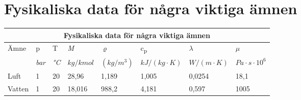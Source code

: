 \chapter{Fysikaliska data för några viktiga ämnen}
\footnotesize
\begin{tabularx}{\textwidth}{ |l|X|X|X|X|X|X|X|   }
\hline
\multicolumn{8}{|c|}{\textbf{Fysikaliska data för några viktiga ämnen}} \\
\hline
Ämne &p &T &\textit{M}&$\varrho$ &c\textsubscript{p}& $\lambda$ & $\mu$\\
		 &\textit{bar}&\textit{°C} &$kg/kmol$&$(kg/m^3)$ &$kJ/(kg \cdot K)$& $W/(m \cdot K) $ & $Pa \cdot s \cdot 10^6$\\
\hline
Luft & 1 &20 & 28,96&1,189 &1,005 &0,0254&18,1\\
Vatten & 1 &20 & 18,016&988,2 &4,181 &0,597&1005\\
\hline
\end{tabularx}
